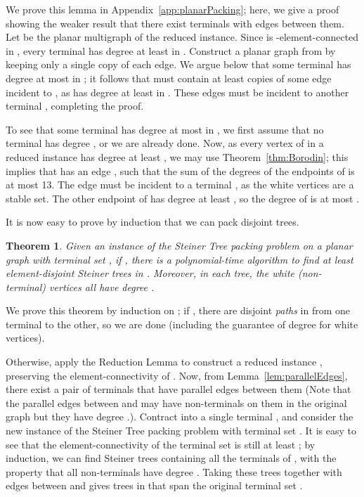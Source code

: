 \documentclass[11pt]{article}
\newtheorem{theorem}[lemma]{Theorem}
\renewenvironment{proof}{\vspace{-0.1in}\noindent{\bf Proof:}}{\hspace*{\fill}\par}
\begin{document}
\begin{proof}
  We prove this lemma in Appendix~\ref{app:planarPacking}; here, we
  give a proof showing the weaker result that there exist terminals
   with  edges between them. Let  be the
  planar multigraph of the reduced instance. Since  is
  -element-connected in , every terminal has degree at least 
  in . Construct a planar graph  from  by keeping only a
  single copy of each edge. We argue below that some terminal  has degree at most  in ; it follows that  must contain
  at least  copies of some edge incident to , as
   has degree at least  in . These edges must be incident
  to another terminal , completing the proof.

  To see that some terminal  has degree at most  in , we
  first assume that no terminal has degree , or we are already
  done. Now, as every vertex of  in a reduced instance has degree
  at least , we may use Theorem~\ref{thm:Borodin}; this implies
  that  has an edge , such that the sum of the degrees of the
  endpoints of  is at most 13. The edge  must be incident to a
  terminal , as the white vertices are a stable set. The other
  endpoint of  has degree at least , so the degree of  is
  at most .
\end{proof}

It is now easy to prove by induction that we can pack  disjoint trees.

\begin{theorem}\label{thm:planarTreePacking}
  Given an instance of the Steiner Tree packing problem on a planar
  graph  with terminal set , if , there is a
  polynomial-time algorithm to find at least 
  element-disjoint Steiner trees in . Moreover, in each tree, 
  the white (non-terminal) vertices all have degree .
\end{theorem}

\begin{proof}
  We prove this theorem by induction on ; if , there are
   disjoint \emph{paths} in  from one terminal to the other, so
  we are done (including the guarantee of degree  for white
  vertices).

  Otherwise, apply the Reduction Lemma to construct a reduced instance
  , preserving the element-connectivity of . Now, from
  Lemma~\ref{lem:parallelEdges}, there exist a pair of terminals  that have  parallel edges between them (Note
  that the parallel edges between  and  may have
  non-terminals on them in the original graph but they have degree
  .). Contract  into a single terminal , and consider
  the new instance of the Steiner Tree packing problem with terminal
  set . It is easy to see that the
  element-connectivity of the terminal set is still at least ; by
  induction, we can find  Steiner trees containing all
  the terminals of , with the property that all non-terminals have
  degree . Taking these trees together with  edges
  between  and  gives  trees in  that
  span the original terminal set .
\end{proof}
\end{document}
